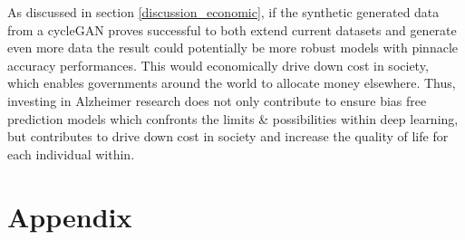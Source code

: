 \documentclass[12pt, fleqn, titlepage]{article}
\newcommand{\1}[1]{\mathds{1}\left[#1\right]}
\begin{document}
As discussed in section \ref{discussion_economic}, if the synthetic generated data from a cycleGAN proves successful to both extend current datasets and generate even more data the result could potentially be more robust models with pinnacle accuracy performances. This would economically drive down cost in society, which enables governments around the world to allocate money elsewhere. Thus, investing in Alzheimer research does not only contribute to ensure bias free prediction models which confronts the limits \& possibilities within deep learning, but contributes to drive down cost in society and increase the quality of life for each individual within.

\newpage
\section{Appendix}\label{appendix}
\end{document}
